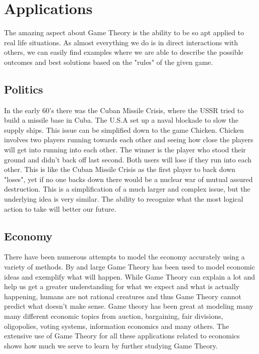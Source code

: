 \documentclass[12pt]{article}
\begin{document}
 	\section{Applications}
 		The amazing aspect about Game Theory is the ability to be so apt applied to real life situations. As almost everything we do is in direct interactions with others, we can easily find examples where we are able to describe the possible outcomes and best solutions based on the "rules" of the given game.
 		\subsection{Politics}
 		In the early 60's there was the Cuban Missile Crisis, where the USSR tried to build a missile base in Cuba. The U.S.A set up a naval blockade to slow the supply ships. This issue can be simplified down to the game Chicken. Chicken involves two players running towards each other and seeing how close the players will get into running into each other. The winner is the player who stood their ground and didn't back off last second. Both users will lose if they run into each other. This is like the Cuban Missile Crisis as the first player to back down "loses", yet if no one backs down there would be a nuclear war of mutual assured destruction. This is a simplification of a much larger and complex issue, but the underlying idea is very similar. The ability to recognize what the most logical action to take will better our future.
 		
 		\subsection{Economy}
 		There have been numerous attempts to model the economy accurately using a variety of methods. By and large Game Theory has been used to model economic ideas and exemplify what will happen. While Game Theory can explain a lot and help us get a greater understanding for what we expect and what is actually happening, humans are not rational creatures and thus Game Theory cannot predict what doesn't make sense. Game theory has been great at modeling many many different economic topics from auction, bargaining, fair divisions, oligopolies, voting systems, information economics and many others. The extensive use of Game Theory for all these applications related to economics shows how much we serve to learn by further studying Game Theory.
\end{document}
